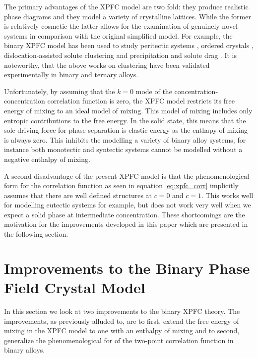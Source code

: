 \documentclass[showkeys, prb, reprint]{revtex4-1}
\begin{document}
The primary advantages of the XPFC model are two fold: they produce realistic
phase diagrams and they model a variety of crystalline lattices. While the
former is relatively cosmetic the latter allows for the examination of
genuinely novel systems in comparison with the original simplified model. For
example, the binary XPFC model has been used to study peritectic systems
\cite{GREENWOOD11_BINARY}, ordered crystals \cite{ALSTER17},
dislocation-assisted solute clustering and precipitation \cite{FALLAH12,
FALLAH13} and solute drag \cite{GREENWOOD12}. It is noteworthy, that the above
works on clustering have been validated experimentally in binary and ternary
alloys.

Unfortunately, by assuming that the $k=0$ mode of the
concentration-concentration correlation function is zero, the XPFC model
restricts its free energy of mixing to an ideal model of mixing. This model of
mixing includes only entropic contributions to the free energy. In the solid
state, this means that the sole driving force for phase separation is elastic
energy as the enthapy of mixing is always zero. This inhibits the modelling a
variety of binary alloy systems, for instance both monotectic and syntectic
systems cannot be modelled without a negative enthalpy of mixing. 

A second disadvantage of the present XPFC model is that the phenomenological
form for the correlation function as seen in equation \ref{eq:xpfc_corr}
implicitly assumes that there are well defined structures at $c=0$ and $c=1$.
This works well for modelling eutectic systems for example, but does not work
very well when we expect a solid phase at intermediate concentration. These
shortcomings are the motivation for the improvements developed in this paper
which are presented in the following section.

\section{Improvements to the Binary Phase Field Crystal Model} %
\label{sec:improvements}

In this section we look at two improvements to the binary XPFC theory. The
improvements, as previously alluded to, are to first, extend the free energy of
mixing in the XPFC model to one with an enthalpy of mixing and to second,
generalize the phenomenological for of the two-point correlation function in
binary alloys.
\end{document}
